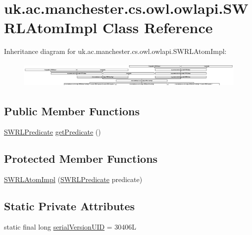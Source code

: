 \hypertarget{classuk_1_1ac_1_1manchester_1_1cs_1_1owl_1_1owlapi_1_1_s_w_r_l_atom_impl}{\section{uk.\-ac.\-manchester.\-cs.\-owl.\-owlapi.\-S\-W\-R\-L\-Atom\-Impl Class Reference}
\label{classuk_1_1ac_1_1manchester_1_1cs_1_1owl_1_1owlapi_1_1_s_w_r_l_atom_impl}
}
Inheritance diagram for uk.\-ac.\-manchester.\-cs.\-owl.\-owlapi.\-S\-W\-R\-L\-Atom\-Impl\-:\begin{figure}[H]
\begin{center}
\leavevmode
\includegraphics[height=1.278539cm]{classuk_1_1ac_1_1manchester_1_1cs_1_1owl_1_1owlapi_1_1_s_w_r_l_atom_impl}
\end{center}
\end{figure}
\subsection*{Public Member Functions}
\begin{DoxyCompactItemize}
\item 
\hyperlink{interfaceorg_1_1semanticweb_1_1owlapi_1_1model_1_1_s_w_r_l_predicate}{S\-W\-R\-L\-Predicate} \hyperlink{classuk_1_1ac_1_1manchester_1_1cs_1_1owl_1_1owlapi_1_1_s_w_r_l_atom_impl_a1345ff711beaa3ffde615d88df007671}{get\-Predicate} ()
\end{DoxyCompactItemize}
\subsection*{Protected Member Functions}
\begin{DoxyCompactItemize}
\item 
\hyperlink{classuk_1_1ac_1_1manchester_1_1cs_1_1owl_1_1owlapi_1_1_s_w_r_l_atom_impl_afc706fea6c2f845d673ab24cdebbffbd}{S\-W\-R\-L\-Atom\-Impl} (\hyperlink{interfaceorg_1_1semanticweb_1_1owlapi_1_1model_1_1_s_w_r_l_predicate}{S\-W\-R\-L\-Predicate} predicate)
\end{DoxyCompactItemize}
\subsection*{Static Private Attributes}
\begin{DoxyCompactItemize}
\item 
static final long \hyperlink{classuk_1_1ac_1_1manchester_1_1cs_1_1owl_1_1owlapi_1_1_s_w_r_l_atom_impl_ae49b0f5f8f130001c74c0c22dfd2b22b}{serial\-Version\-U\-I\-D} = 30406\-L
\end{DoxyCompactItemize}
